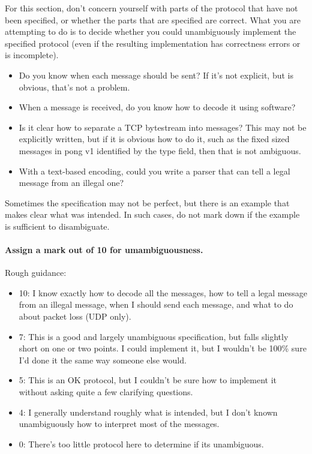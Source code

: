 \documentclass{article}
\begin{document}
For this section, don't concern yourself with parts of the protocol
that have not been specified, or whether the parts that are specified
are correct.  What you are attempting to do is to decide whether you
could unambiguously implement the specified protocol (even if the
resulting implementation has correctness errors or is incomplete).

\begin{itemize}
\item Do you know when each message should be sent?  If it's not explicit, but is obvious, that's not a problem.  

\item When a message is received, do you know how to decode it using
software?

\item Is it clear how to separate a TCP bytestream into messages?
This may not be explicitly written, but if it is obvious how to do it,
such as the fixed sized messages in pong v1 identified by the type
field, then that is not ambiguous.

\item With a text-based encoding, could you write a parser that can
tell a legal message from an illegal one? 
\end{itemize}

Sometimes the specification may not be perfect, but there is an
example that makes clear what was intended.  In such cases, do not
mark down if the example is sufficient to disambiguate.

\paragraph{Assign a mark out of 10 for umambiguousness.}

Rough guidance:

\begin{itemize}
\item 10:  I know exactly how to decode all the messages, how to tell a legal message from an illegal message, when I should send each message, and what to do about packet loss (UDP only).

\item 7:  This is a good and largely unambiguous specification, but falls slightly short on one or two points.  I could implement it, but I wouldn't be 100\% sure I'd done it the same way someone else would.

\item 5:  This is an OK protocol, but I couldn't be sure how to implement it without asking quite a few clarifying questions.

\item 4:  I generally understand roughly what is intended, but I don't known unambiguously how to interpret most of the messages.

\item 0: There's too little protocol here to determine if its unambiguous.
\end{itemize}
\end{document}
